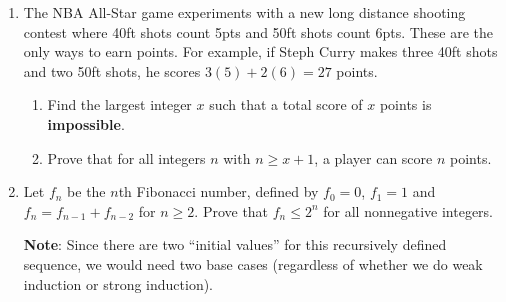 \documentclass[fleqn]{article}
\theoremstyle{definition}
\begin{document}
\begin{enumerate}
\item The NBA All-Star game experiments with a new long distance shooting contest where 40ft shots count 5pts and 50ft shots count 6pts. These are the only ways to earn points. For example, if Steph Curry makes three 40ft shots and two 50ft shots, he scores $3(5)+2(6)=27$ points. 
	\begin{enumerate}
	\item Find the largest integer $x$ such that a total score of $x$ points is \textbf{impossible}. 
	\item Prove that for all integers $n$ with $n \geq x+1$, a player can score $n$ points.
	\end{enumerate}


\newpage

\item Let $f_n$ be the $n$th Fibonacci number, defined by $f_0=0$, $f_1=1$ and $f_n=f_{n-1}+f_{n-2}$ for $n \geq 2$. Prove that $f_n \leq 2^n$ for all nonnegative integers. 

\vspace{.25cm}
\textbf{Note}: Since there are two ``initial values'' for this recursively defined sequence, we would need two base cases (regardless of whether we do weak induction or strong induction). 



\end{enumerate}
\end{document}
